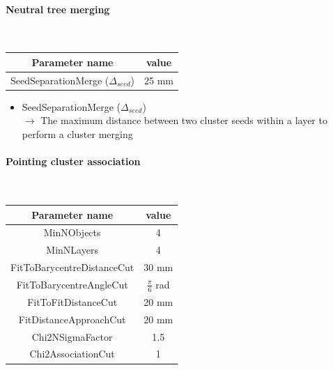 \documentclass[12pt]{article}
\begin{document}
\paragraph{Neutral tree merging} ~

\begin{table}[!ht]
  \begin{center}
    \begin{tabu} to \linewidth { c | c } 
          Parameter name & value \\
          \hline
          SeedSeparationMerge ($\Delta_{seed}$) & 25 mm
    \end{tabu}
  \end{center}
\end{table}

\begin{itemize}
  \item SeedSeparationMerge ($\Delta_{seed}$) \\
  $\rightarrow$ The maximum distance between two cluster seeds within a layer to perform a cluster merging
\end{itemize}


\paragraph{Pointing cluster association} ~

\begin{table}[!ht]
  \begin{center}
    \begin{tabu} to \linewidth { c | c } 
          Parameter name & value \\
          \hline
          MinNObjects & 4 \\
          MinNLayers & 4 \\
          FitToBarycentreDistanceCut & 30 mm \\
          FitToBarycentreAngleCut & $\frac{\pi}{6}$ rad \\
          FitToFitDistanceCut & 20 mm \\
          FitDistanceApproachCut & 20 mm \\
          Chi2NSigmaFactor & 1.5 \\
          Chi2AssociationCut & 1
    \end{tabu}
  \end{center}
\end{table}
\end{document}
